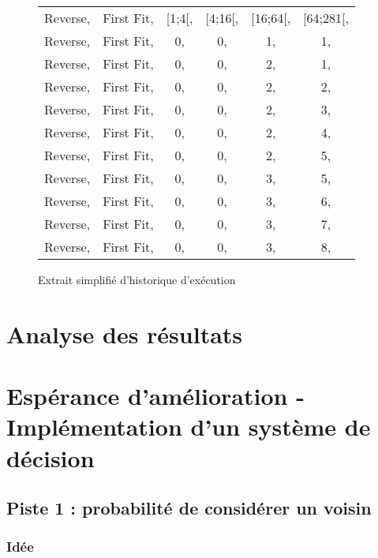 \documentclass[a4paper,10pt]{report}
\begin{document}
\begin{figure}[ht]
  \begin{tabular}{cccccc}
    Reverse,&First Fit,&[1;4[,&[4;16[,&[16;64[,&[64;281[,\\
    Reverse,&First Fit,&0,    &0,     &1,      &1,\\
    Reverse,&First Fit,&0,    &0,     &2,      &1,\\
    Reverse,&First Fit,&0,    &0,     &2,      &2,\\
    Reverse,&First Fit,&0,    &0,     &2,      &3,\\
    Reverse,&First Fit,&0,    &0,     &2,      &4,\\
    Reverse,&First Fit,&0,    &0,     &2,      &5,\\
    Reverse,&First Fit,&0,    &0,     &3,      &5,\\
    Reverse,&First Fit,&0,    &0,     &3,      &6,\\
    Reverse,&First Fit,&0,    &0,     &3,      &7,\\
    Reverse,&First Fit,&0,    &0,     &3,      &8,\\
  \end{tabular}
  \label{a280-sample-interval-simple}
  \caption{Extrait simplifié d'historique d'exécution}
\end{figure}

\pagebreak
\section{Analyse des résultats}

\section{Espérance d'amélioration - Implémentation d'un système de décision}

\paragraph{}

\subsection{Piste 1 : probabilité de considérer un voisin}
\subsubsection{Idée}
%
\end{document}
